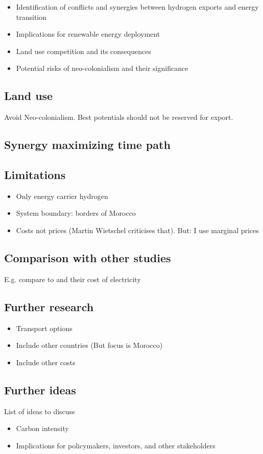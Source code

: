 \begin{itemize}
    \item Identification of conflicts and synergies between hydrogen exports and energy transition
    \item Implications for renewable energy deployment
    \item Land use competition and its consequences
    \item Potential risks of neo-colonialism and their significance
\end{itemize}


\subsection{Land use}
Avoid Neo-colonialism. Best potentials should not be reserved for export.

\subsection{Synergy maximizing time path}

\subsection{Limitations}
\label{subsec:limitations}
\begin{itemize}
    \item Only energy carrier hydrogen
    \item System boundary: borders of Morocco
    \item Costs not prices (Martin Wietschel criticises that). But: I use marginal prices
\end{itemize}

\subsection{Comparison with other studies}
E.g. compare to \cite{Hampp2021} and their cost of electricity

\subsection{Further research}
\begin{itemize}
    \item Transport options
    \item Include other countries (But focus is Morocco)
    \item Include other costs
\end{itemize}

\subsection{Further ideas}
List of ideas to discuss
\begin{itemize}
    \item Carbon intensity
    \item Implications for policymakers, investors, and other stakeholders
\end{itemize}